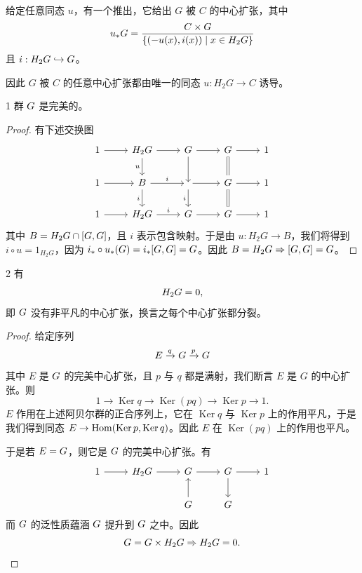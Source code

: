 给定任意同态 $u$，有一个推出，它给出 $G$ 被 $C$ 的中心扩张，其中
\[
  u_* G = \frac{C\times G}{\{(-u(x), i(x)) \mid x\in H_2G\}}
\]
且 $i : H_2G \hookrightarrow  G$。

因此 $G$ 被 $C$ 的任意中心扩张都由唯一的同态 $u : H_2G \to C$ 诱导。

\begin{prop}{1}
群 $ G$ 是完美的。
\end{prop}

\begin{proof}
有下述交换图
\[
  \begin{tikzcd}
    1 \arrow[r] & H_2G \arrow[r] \arrow[d, "u"'] & \wt G \arrow[r] \arrow[d] & G \arrow[r] \arrow[d, equal] & 1 \\
    1 \arrow[r] & B \arrow[r, "i"] \arrow[d, "i"'] & [\wt G,\wt G] \arrow[r] \arrow[d, "i"'] & G \arrow[r] \arrow[d, equal] & 1 \\
    1 \arrow[r] & H_2G \arrow[r, "i"] & \wt G \arrow[r] & G \arrow[r] & 1
  \end{tikzcd}
\]
其中 $B = H_2G \cap [ G, G]$，且 $i$ 表示包含映射。于是由 $u : H_2G \to B$，我们将得到 $i\circ u = 1_{H_2G}$，因为 $i_*\circ u_*(G) = i_*[ G, G] =  G$。因此 $B = H_2G \Rightarrow [ G, G] =  G$。
\end{proof}

\begin{prop}{2}
有
\[
  H_2 G = 0,
\]
即 $ G$ 没有非平凡的中心扩张，换言之每个中心扩张都分裂。
\end{prop}

\begin{proof}
给定序列
\[
  E \xrightarrow{q}  G \xrightarrow{p} G
\]
其中 $E$ 是 $ G$ 的完美中心扩张，且 $p$ 与 $q$ 都是满射，我们断言 $E$ 是 $G$ 的中心扩张。则
\[
  1 \to \operatorname{Ker}q \to \operatorname{Ker}(pq) \to \operatorname{Ker}p \to 1.
\]
$E$ 作用在上述阿贝尔群的正合序列上，它在 $\operatorname{Ker}q$ 与 $\operatorname{Ker}p$ 上的作用平凡，于是我们得到同态 $E \to \operatorname{Hom}(\operatorname{Ker}p,\operatorname{Ker}q)$。因此 $E$ 在 $\operatorname{Ker}(pq)$ 上的作用也平凡。

于是若 $E = { G}$，则它是 $ G$ 的完美中心扩张。有
\[
  \begin{tikzcd}
    1 \arrow[r] & H_2\wt G \arrow[r] & \wt{\wt G} \arrow[r] & \wt G \arrow[r] \arrow[d] & 1 \\
    & & \wt G \arrow[u] & G &
  \end{tikzcd}
\]
而 $ G$ 的泛性质蕴涵 $ G$ 提升到 ${ G}$ 之中。因此
\[
  { G} =  G \times H_2 G \Rightarrow H_2 G = 0.
\]
\end{proof}

